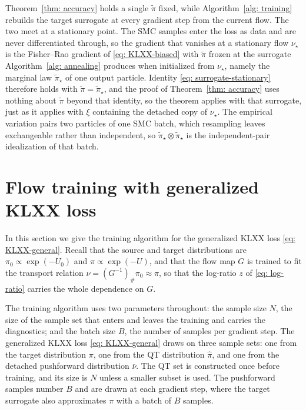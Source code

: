 \documentclass{article}
\begin{document}
Theorem~\ref{thm: accuracy} holds a single $\tilde\pi$ fixed, while Algorithm~\ref{alg: training} rebuilds the target surrogate at every gradient step from the current flow. The two meet at a stationary point. The SMC samples enter the loss as data and are never differentiated through, so the gradient that vanishes at a stationary flow $\nu_\star$ is the Fisher--Rao gradient of \eqref{eq: KLXX-biased} with $\tilde\pi$ frozen at the surrogate Algorithm~\ref{alg: annealing} produces when initialized from $\nu_\star$, namely the marginal law $\tilde\pi_\star$ of one output particle. Identity \eqref{eq: surrogate-stationary} therefore holds with $\tilde\pi=\tilde\pi_\star$, and the proof of Theorem~\ref{thm: accuracy} uses nothing about $\tilde\pi$ beyond that identity, so the theorem applies with that surrogate, just as it applies with $\xi$ containing the detached copy of $\nu_\star$. The empirical variation pairs two particles of one SMC batch, which resampling leaves exchangeable rather than independent, so $\tilde\pi_\star\otimes\tilde\pi_\star$ is the independent-pair idealization of that batch.

\section{Flow training with generalized KLXX loss}
\label{sec: training}

In this section we give the training algorithm for the generalized KLXX loss \eqref{eq: KLXX-general}. Recall that the source and target distributions are $\pi_0\propto \exp(-U_0)$ and $\pi\propto \exp(-U)$, and that the flow map $G$ is trained to fit the transport relation $\nu=(G^{-1})_{\#}\pi_0\approx\pi$, so that the log-ratio $z$ of \eqref{eq: log-ratio} carries the whole dependence on $G$.

The training algorithm uses two parameters throughout: the sample size $N$, the size of the sample set that enters and leaves the training and carries the diagnostics; and the batch size $B$, the number of samples per gradient step.
The generalized KLXX loss \eqref{eq: KLXX-general} draws on three sample sets: one from the target distribution $\pi$, one from the QT distribution $\hat\pi$, and one from the detached pushforward distribution $\bar\nu$. The QT set is constructed once before training, and its size is $N$ unless a smaller subset is used. The pushforward samples number $B$ and are drawn at each gradient step, where the target surrogate also approximates $\pi$ with a batch of $B$ samples.
\end{document}
